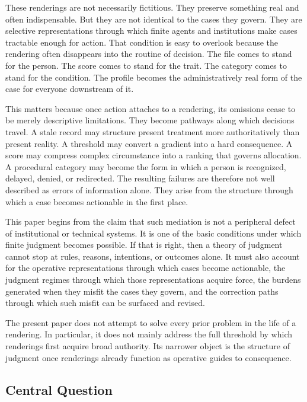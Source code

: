 \documentclass[11pt]{article}
\begin{document}
These renderings are not necessarily fictitious. They preserve something real and often indispensable. But they are not identical to the cases they govern. They are selective representations through which finite agents and institutions make cases tractable enough for action. That condition is easy to overlook because the rendering often disappears into the routine of decision. The file comes to stand for the person. The score comes to stand for the trait. The category comes to stand for the condition. The profile becomes the administratively real form of the case for everyone downstream of it.

This matters because once action attaches to a rendering, its omissions cease to be merely descriptive limitations. They become pathways along which decisions travel. A stale record may structure present treatment more authoritatively than present reality. A threshold may convert a gradient into a hard consequence. A score may compress complex circumstance into a ranking that governs allocation. A procedural category may become the form in which a person is recognized, delayed, denied, or redirected. The resulting failures are therefore not well described as errors of information alone. They arise from the structure through which a case becomes actionable in the first place.

This paper begins from the claim that such mediation is not a peripheral defect of institutional or technical systems. It is one of the basic conditions under which finite judgment becomes possible. If that is right, then a theory of judgment cannot stop at rules, reasons, intentions, or outcomes alone. It must also account for the operative representations through which cases become actionable, the judgment regimes through which those representations acquire force, the burdens generated when they misfit the cases they govern, and the correction paths through which such misfit can be surfaced and revised.

The present paper does not attempt to solve every prior problem in the life of a rendering. In particular, it does not mainly address the full threshold by which renderings first acquire broad authority. Its narrower object is the structure of judgment once renderings already function as operative guides to consequence.

\subsection{Central Question}
\end{document}
